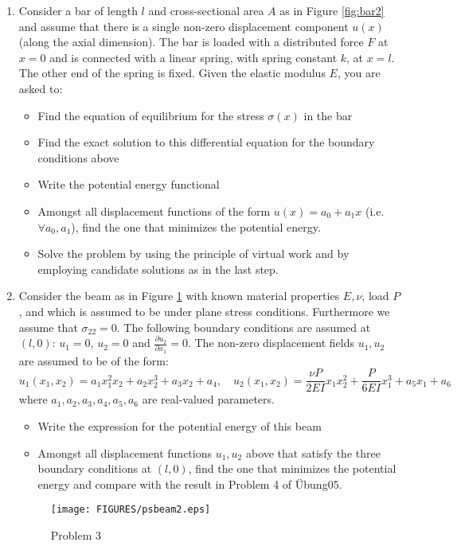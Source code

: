 \documentclass{article}
\newcommand{\ee}{\end{equation}}
\newcommand{\be}{\begin{equation}}
\newcommand{\bi}{\begin{itemize}}
\newcommand{\ei}{\end{itemize}}
\newcommand{\pa}{\partial}
\begin{document}
\begin{enumerate}
\item Consider a  bar of length $l$ and cross-sectional area $A$ as in Figure \ref{fig:bar2} and assume that there is a single non-zero displacement component $u(x)$ (along the axial dimension).
The bar is loaded with a distributed force $F$ at $x=0$ and is connected with a linear spring, with spring constant $k$, at $x=l$. The other end of the  spring is fixed.
Given the elastic modulus $E$, you are asked to:
\bi
\item Find the equation of equilibrium for the stress $\sigma(x)$ in the bar
\item Find the exact solution to this differential equation for the boundary conditions above
\item Write the potential energy functional
\item Amongst all displacement functions of the form $u(x)=a_0+a_1x$ (i.e. $\forall a_0,a_1$), find the one that  minimizes the potential energy.
\item Solve the problem by using the principle of virtual work and by employing candidate solutions as in the last  step.
\ei



\item Consider the beam as in Figure \ref{fig:cantips} with known material properties $E,\nu$,  load $P$, and which is assumed to be under plane stress conditions.
Furthermore we assume that $\sigma_{22}=0$.
The following boundary conditions are assumed at $(l,0)$: $u_1=0$, $u_2=0$ and $\frac{\pa u_2}{\pa x_1}=0$. 
The non-zero displacement fields $u_1, u_2$ are assumed to be of the form:
\be
u_1(x_1,x_2)=a_1x_1^2x_2 +a_2 x_2^3+a_3x_2+a_4, \quad u_2(x_1,x_2)=\frac{\nu P}{2EI} x_1x_2^2+\frac{P}{6EI} x_1^3+a_5x_1+a_6
\ee
where $a_1, a_2, a_3, a_4, a_5, a_6$ are real-valued parameters.
\bi
\item Write the expression for the potential energy of this beam
\item Amongst all displacement functions $u_1,u_2$ above that satisfy the three boundary conditions at $(l,0)$, find the one that minimizes the potential energy and compare with the result in Problem 4  of \"Ubung05.
\ei

\begin{figure}[!h]
\centering
{}
\texttt{[image: FIGURES/psbeam2.eps]}
\label{fig:cantips}
\caption{Problem 3}
\end{figure}


\end{enumerate}
\end{document}

